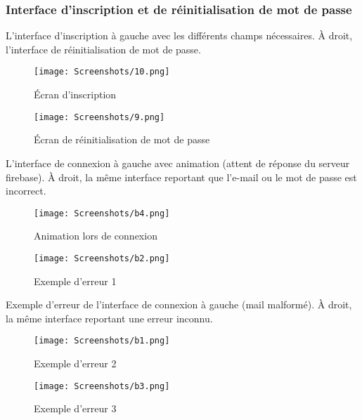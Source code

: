  \subsubsection{Interface d'inscription et de réinitialisation de mot de passe}
  L'interface d'inscription à gauche avec les différents champs nécessaires. À droit, l'interface de  réinitialisation de mot de passe.
  $ $
  \begin{figure}[!htbp]
    \begin{minipage}[t]{0.4\textwidth}    %
            \texttt{[image: Screenshots/10.png]}
            \caption{ Écran d'inscription}
    \end{minipage}%
    \begin{minipage}{0.20\textwidth}
      \hfill
    \end{minipage}
  \begin{minipage}[t]{0.4\textwidth}
          \texttt{[image: Screenshots/9.png]}
          \caption{ Écran de réinitialisation de mot de passe}
  \end{minipage}%
    \end{figure}
\newpage
L'interface de connexion à gauche avec animation (attent de réponse du serveur firebase). À droit, la même interface reportant que l'e-mail ou le mot de passe est incorrect.
\begin{figure}[!htbp]
      \begin{minipage}[t]{0.4\textwidth}    %
              \texttt{[image: Screenshots/b4.png]}
              \caption{ Animation lors de connexion}
      \end{minipage}%
      \begin{minipage}{0.20\textwidth}
        \hfill
      \end{minipage}
    \begin{minipage}[t]{0.4\textwidth}
            \texttt{[image: Screenshots/b2.png]}
            \caption{ Exemple d'erreur 1}
    \end{minipage}%
      \end{figure}
      \newpage
      Exemple d'erreur de l'interface de connexion à gauche (mail malformé). À droit, la même interface reportant une erreur inconnu.
      \begin{figure}[!htbp]
        \begin{minipage}[t]{0.4\textwidth}    %
                \texttt{[image: Screenshots/b1.png]}
                \caption{ Exemple d'erreur 2}
        \end{minipage}%
        \begin{minipage}{0.20\textwidth} 
          \hfill
        \end{minipage}
      \begin{minipage}[t]{0.4\textwidth}
              \texttt{[image: Screenshots/b3.png]}
              \caption{ Exemple d'erreur 3}
      \end{minipage}%
        \end{figure}
\newpage

